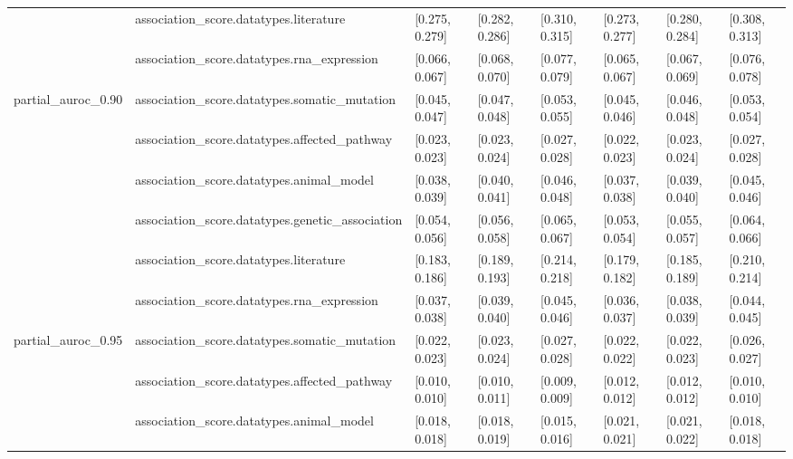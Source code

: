 \begin{table}[H]
{\begin{tabular}{llllllll}
 & association\_score.datatypes.literature & [0.275, 0.279] & [0.282, 0.286] & [0.310, 0.315] & [0.273, 0.277] & [0.280, 0.284] & [0.308, 0.313]\\

 & association\_score.datatypes.rna\_expression & [0.066, 0.067] & [0.068, 0.070] & [0.077, 0.079] & [0.065, 0.067] & [0.067, 0.069] & [0.076, 0.078]\\

\multirow{-6}{*}{\raggedright\arraybackslash partial\_auroc\_0.90} & association\_score.datatypes.somatic\_mutation & [0.045, 0.047] & [0.047, 0.048] & [0.053, 0.055] & [0.045, 0.046] & [0.046, 0.048] & [0.053, 0.054]\\
\cmidrule{1-8}
 & association\_score.datatypes.affected\_pathway & [0.023, 0.023] & [0.023, 0.024] & [0.027, 0.028] & [0.022, 0.023] & [0.023, 0.024] & [0.027, 0.028]\\

 & association\_score.datatypes.animal\_model & [0.038, 0.039] & [0.040, 0.041] & [0.046, 0.048] & [0.037, 0.038] & [0.039, 0.040] & [0.045, 0.046]\\

 & association\_score.datatypes.genetic\_association & [0.054, 0.056] & [0.056, 0.058] & [0.065, 0.067] & [0.053, 0.054] & [0.055, 0.057] & [0.064, 0.066]\\

 & association\_score.datatypes.literature & [0.183, 0.186] & [0.189, 0.193] & [0.214, 0.218] & [0.179, 0.182] & [0.185, 0.189] & [0.210, 0.214]\\

 & association\_score.datatypes.rna\_expression & [0.037, 0.038] & [0.039, 0.040] & [0.045, 0.046] & [0.036, 0.037] & [0.038, 0.039] & [0.044, 0.045]\\

\multirow{-6}{*}{\raggedright\arraybackslash partial\_auroc\_0.95} & association\_score.datatypes.somatic\_mutation & [0.022, 0.023] & [0.023, 0.024] & [0.027, 0.028] & [0.022, 0.022] & [0.022, 0.023] & [0.026, 0.027]\\
\cmidrule{1-8}
 & association\_score.datatypes.affected\_pathway & [0.010, 0.010] & [0.010, 0.011] & [0.009, 0.009] & [0.012, 0.012] & [0.012, 0.012] & [0.010, 0.010]\\

 & association\_score.datatypes.animal\_model & [0.018, 0.018] & [0.018, 0.019] & [0.015, 0.016] & [0.021, 0.021] & [0.021, 0.022] & [0.018, 0.018]\\


\end{tabular}}
\end{table}
